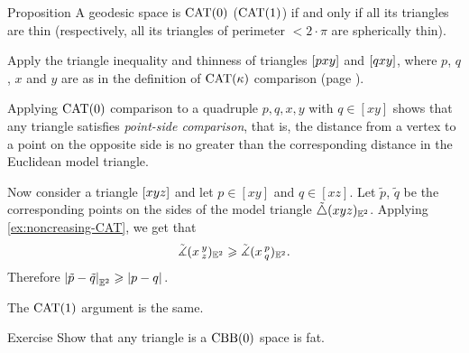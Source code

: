 \begin{thm}{Proposition}\label{prop:thin=cat}
A geodesic space is $\mathrm{CAT}(0)$ 
($\mathrm{CAT}(1)$) 
if and only if 
all its triangles are thin (respectively, all its triangles of perimeter $<2\cdot\pi$ are spherically thin).
\end{thm}

Apply  the triangle inequality and thinness of triangles $[pxy]$ and $[qxy]$, where $p$, $q$, $x$ and $y$ are as in the definition of $\mathrm{CAT}(\kappa)$ comparison (page \pageref{page:CAT-comparison}).

Applying $\mathrm{CAT}(0)$ comparison to a quadruple $p,q,x,y$ with $q\in [xy]$ shows that any triangle satisfies \emph{point-side comparison}, that is, the distance from a vertex to a  point on the opposite side is no greater than the corresponding distance in the Euclidean model triangle.  

Now consider a triangle $[xyz]$ and let $p\in [xy]$ and $q\in [xz]$.
Let $\tilde p$, $\tilde q$ be the corresponding points on the sides of the model triangle $\tilde\triangle({x}{y}{z})_{\mathbb{E}^2}$.
Applying \ref{ex:noncreasing-CAT}, we get that
\[\tilde\measuredangle(x\,{}^{y}_{z})_{\mathbb{E}^2} \geqslant \tilde\measuredangle(x\,{}^{p}_{q}) _{\mathbb{E}^2}.\]
Therefore $ \dist{\tilde p}{\tilde q}{\EE^2}\ge \dist{p}{q}{}$.

The $\mathrm{CAT}(1)$ argument is the same.
\qeds

\begin{thm}{Exercise}\label{ex:fat-triangle}
Show that any triangle is a $\mathrm{CBB}(0)$ space is fat. 
\end{thm}


